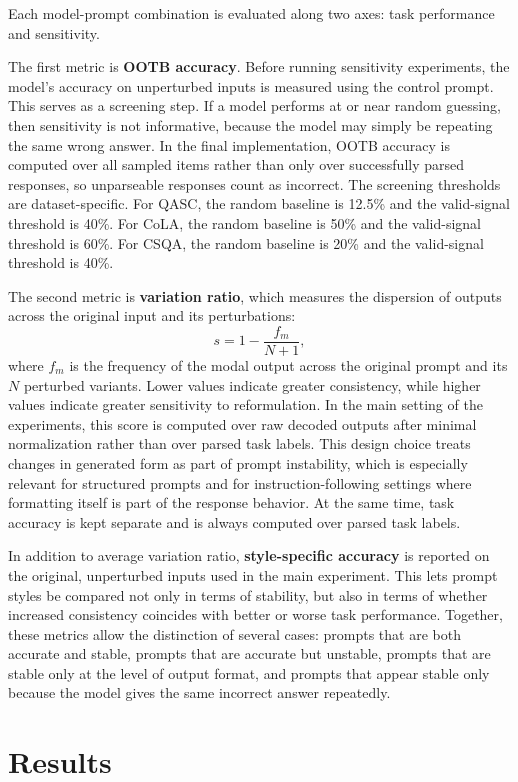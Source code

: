 \documentclass[11pt]{article}
\begin{document}
Each model-prompt combination is evaluated along two axes: task performance and sensitivity.

The first metric is \textbf{OOTB accuracy}. Before running sensitivity experiments, the model's accuracy on unperturbed inputs is measured using the control prompt. This serves as a screening step. If a model performs at or near random guessing, then sensitivity is not informative, because the model may simply be repeating the same wrong answer. In the final implementation, OOTB accuracy is computed over all sampled items rather than only over successfully parsed responses, so unparseable responses count as incorrect. The screening thresholds are dataset-specific. For QASC, the random baseline is 12.5\% and the valid-signal threshold is 40\%. For CoLA, the random baseline is 50\% and the valid-signal threshold is 60\%. For CSQA, the random baseline is 20\% and the valid-signal threshold is 40\%.

The second metric is \textbf{variation ratio}, which measures the dispersion of outputs across the original input and its perturbations:
\[
s = 1 - \frac{f_m}{N+1},
\]
where $f_m$ is the frequency of the modal output across the original prompt and its $N$ perturbed variants. Lower values indicate greater consistency, while higher values indicate greater sensitivity to reformulation. In the main setting of the experiments, this score is computed over raw decoded outputs after minimal normalization rather than over parsed task labels. This design choice treats changes in generated form as part of prompt instability, which is especially relevant for structured prompts and for instruction-following settings where formatting itself is part of the response behavior. At the same time, task accuracy is kept separate and is always computed over parsed task labels.

In addition to average variation ratio, \textbf{style-specific accuracy} is reported on the original, unperturbed inputs used in the main experiment. This lets prompt styles be compared not only in terms of stability, but also in terms of whether increased consistency coincides with better or worse task performance. Together, these metrics allow the distinction of several cases: prompts that are both accurate and stable, prompts that are accurate but unstable, prompts that are stable only at the level of output format, and prompts that appear stable only because the model gives the same incorrect answer repeatedly.

\section{Results}
\end{document}
